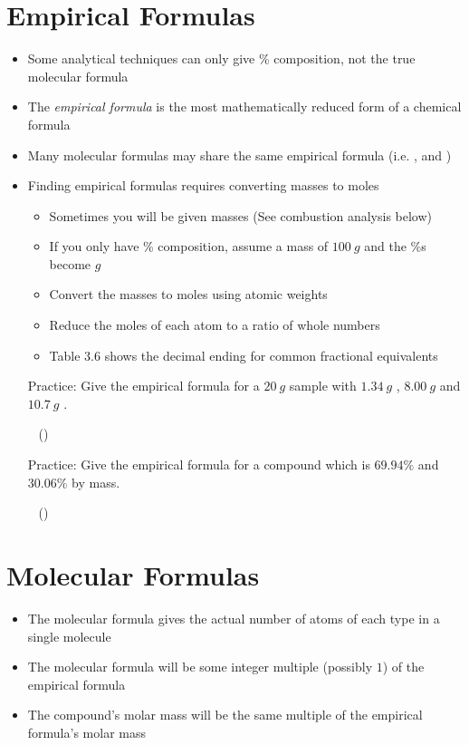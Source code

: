 \documentclass[12pt, openany, letterpaper]{memoir}
\begin{document}
\section{Empirical Formulas}
\begin{itemize}
	\item Some analytical techniques can only give \% composition, not the true molecular formula
	\item The \emph{empirical formula} is the most mathematically reduced form of a chemical formula
	\item Many molecular formulas may share the same empirical formula (i.e. ,  and )
	\item Finding empirical formulas requires converting masses to moles
	\begin{itemize}
		\item Sometimes you will be given masses (See combustion analysis below)
		\item If you only have \% composition, assume a mass of $100~g$ and the \%s become $g$
		\item Convert the masses to moles using atomic weights
		\item Reduce the moles of each atom to a ratio of whole numbers
		\item Table 3.6 shows the decimal ending for common fractional equivalents
	\end{itemize}

	Practice: Give the empirical formula for a $20~g$ sample with $1.34~g$ , $8.00~g$  and $10.7~g$ .
	
	~\hphantom{Practice:} ()
	
	Practice: Give the empirical formula for a compound which is $69.94\%$  and $30.06\%$  by mass.
	
	~\hphantom{Practice:} ()
\end{itemize}
\section{Molecular Formulas}
\begin{itemize}
	\item The molecular formula gives the actual number of atoms of each type in a single molecule
	\item The molecular formula will be some integer multiple (possibly $1$) of the empirical formula
	\item The compound's molar mass will be the same multiple of the empirical formula's molar mass
\end{itemize}
\end{document}
